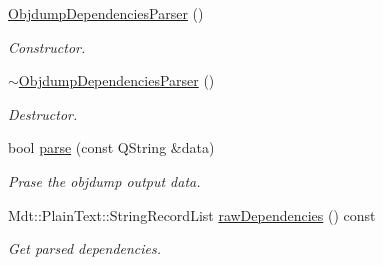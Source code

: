 \begin{DoxyCompactItemize}
\item 
\hyperlink{class_mdt_1_1_deploy_utils_1_1_objdump_dependencies_parser_ae543b682413540d2b3ffb472588a939b}{Objdump\+Dependencies\+Parser} ()\hypertarget{class_mdt_1_1_deploy_utils_1_1_objdump_dependencies_parser_ae543b682413540d2b3ffb472588a939b}{}\label{class_mdt_1_1_deploy_utils_1_1_objdump_dependencies_parser_ae543b682413540d2b3ffb472588a939b}

\begin{DoxyCompactList}\small\item\em Constructor. \end{DoxyCompactList}\item 
\hyperlink{class_mdt_1_1_deploy_utils_1_1_objdump_dependencies_parser_a25d5d1b986d8fd8813a400f43e8293b0}{$\sim$\+Objdump\+Dependencies\+Parser} ()\hypertarget{class_mdt_1_1_deploy_utils_1_1_objdump_dependencies_parser_a25d5d1b986d8fd8813a400f43e8293b0}{}\label{class_mdt_1_1_deploy_utils_1_1_objdump_dependencies_parser_a25d5d1b986d8fd8813a400f43e8293b0}

\begin{DoxyCompactList}\small\item\em Destructor. \end{DoxyCompactList}\item 
bool \hyperlink{class_mdt_1_1_deploy_utils_1_1_objdump_dependencies_parser_af70d3b3ccf5bf277e3b294f12c167819}{parse} (const Q\+String \&data)\hypertarget{class_mdt_1_1_deploy_utils_1_1_objdump_dependencies_parser_af70d3b3ccf5bf277e3b294f12c167819}{}\label{class_mdt_1_1_deploy_utils_1_1_objdump_dependencies_parser_af70d3b3ccf5bf277e3b294f12c167819}

\begin{DoxyCompactList}\small\item\em Prase the objdump output data. \end{DoxyCompactList}\item 
Mdt\+::\+Plain\+Text\+::\+String\+Record\+List \hyperlink{class_mdt_1_1_deploy_utils_1_1_objdump_dependencies_parser_a772af6ac8d2b7e5dbdc354aeb404db0d}{raw\+Dependencies} () const \hypertarget{class_mdt_1_1_deploy_utils_1_1_objdump_dependencies_parser_a772af6ac8d2b7e5dbdc354aeb404db0d}{}\label{class_mdt_1_1_deploy_utils_1_1_objdump_dependencies_parser_a772af6ac8d2b7e5dbdc354aeb404db0d}

\begin{DoxyCompactList}\small\item\em Get parsed dependencies. \end{DoxyCompactList}\end{DoxyCompactItemize}


